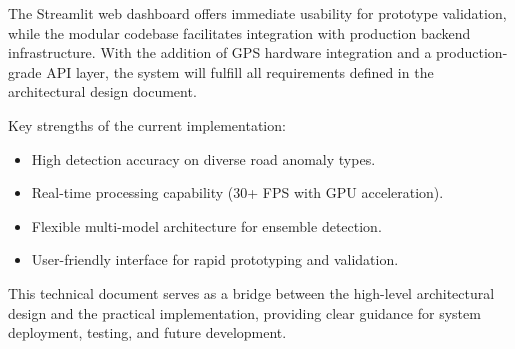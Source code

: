\documentclass[12pt]{article}
\begin{document}
\medskip

The Streamlit web dashboard offers immediate usability for prototype validation, while the modular codebase facilitates integration with production backend infrastructure. With the addition of GPS hardware integration and a production-grade API layer, the system will fulfill all requirements defined in the architectural design document.

\medskip

Key strengths of the current implementation:

\begin{itemize}
    \item High detection accuracy on diverse road anomaly types.
    \item Real-time processing capability (30+ FPS with GPU acceleration).
    \item Flexible multi-model architecture for ensemble detection.
    \item User-friendly interface for rapid prototyping and validation.
\end{itemize}

\medskip

This technical document serves as a bridge between the high-level architectural design and the practical implementation, providing clear guidance for system deployment, testing, and future development.
\end{document}
